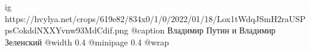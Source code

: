  
 
 
 
 

\ifcmt
  ig https://hvylya.net/crops/619e82/834x0/1/0/2022/01/18/Lox1tWdqJSmH2raUSPpsCokddNXXYvnw93MdCdif.png
  @caption Владимир Путин и Владимир Зеленский
  @width 0.4
  @minipage 0.4
  @wrap \parpic[r]
\fi
